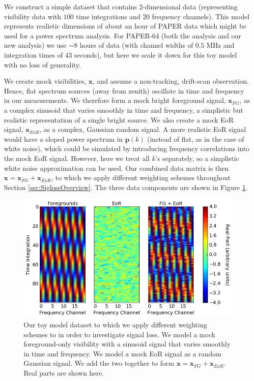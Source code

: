 \documentclass[preprint2,numberedappendix,tighten]{aastex6}  %
\begin{document}
We construct a simple dataset that contains 2-dimensional data (representing visibility data with $100$ time 
integrations and $20$ frequency channels). This model represents realistic dimensions of about an hour of PAPER data which 
might be used for a power spectrum analysis. For PAPER-64 (both the  analysis and our new analysis) we use $\sim8$ hours of data (with channel 
widths of $0.5$ MHz and integration times of $43$ seconds), but here we scale it down for this toy model with no loss of 
generality. 

We create mock visibilities, $\textbf{x}$, and assume a non-tracking, drift-scan observation. Hence, flat spectrum sources (away 
from zenith) oscillate in time and frequency in our measurements. We therefore form a mock bright foreground signal, $
\textbf{x}_{FG}$, as a complex sinusoid that varies smoothly in time and frequency, a simplistic but realistic representation of a 
single bright source. We also create a mock EoR signal, $\textbf{x}_{EoR}$, as a complex, Gaussian random signal. A more 
realistic EoR signal would have a sloped power spectrum in $\textbf{p}(k)$ (instead of flat, as in the case of white noise), 
which could be simulated by introducing frequency correlations into the mock EoR signal. However, here we treat all 
$k$'s separately, so a simplistic white noise approximation can be used. Our combined data matrix is then $\textbf{x} = 
\textbf{x}_{FG} + \textbf{x}_{EoR}$, to which we apply different weighting schemes throughout Section \ref{sec:SiglossOverview}. The three data components are shown in Figure 
\ref{fig:toy_sigloss1}. 

\begin{figure}
	\centering
	\includegraphics[trim={0cm 0cm 0cm 0cm},clip,width=\columnwidth]{plots/toy_sigloss1.png}
	\caption{Our toy model dataset to which we apply different weighting schemes to in order to investigate signal loss. We model a mock foreground-only visibility with a sinusoid signal that varies smoothly in 
time and frequency. We model a mock EoR signal as a random Gaussian signal. We add the two together to form $\textbf{x} = 
\textbf{x}_{FG} + \textbf{x}_{EoR}$. Real parts are shown here.}
	\label{fig:toy_sigloss1}
\end{figure}
\end{document}
